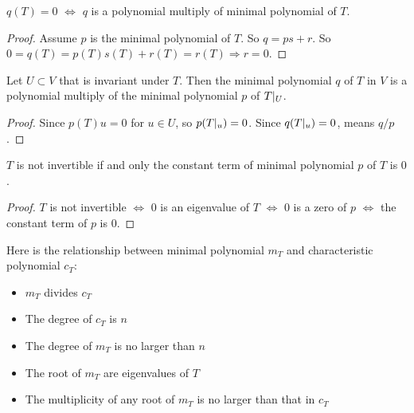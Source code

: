 \begin{theorem}\label{polynomial_multiply_of_minimal_polynomial}
    $q(T) = 0$ $\Leftrightarrow$ $q$ is a polynomial multiply of minimal polynomial of $T$.
\end{theorem}
\begin{proof}
    Assume $p$ is the minimal polynomial of $T$. So $q = ps + r$. So $0 = q(T) = p(T) s(T) + r(T) = r(T) \Rightarrow r = 0$.
\end{proof}


\begin{theorem}
    Let $U \subset V$ that is invariant under $T$. Then the minimal polynomial $q$ of $T$ in $V$ is a polynomial multiply of the minimal polynomial $p$ of ${T}|_{U}$.
\end{theorem}
\begin{proof}
    Since $p(T)u=0$ for $u \in U$, so $p({T}|_{u}) = 0$. Since $q({T}|_{u}) = 0$,  means $q/p$.
\end{proof}

\begin{theorem}
    $T$ is not invertible if and only the constant term of minimal polynomial $p$ of $T$ is $0$.
\end{theorem}
\begin{proof}
    $T$ is not invertible $\Leftrightarrow$ $0$ is an eigenvalue of $T$ $\Leftrightarrow$ $0$ is a zero of $p$ $\Leftrightarrow$ the constant term of $p$ is $0$.
\end{proof}


\begin{theorem}
    Here is the relationship between minimal polynomial $m_T$ and characteristic polynomial $c_T$:
    \begin{itemize}
        \item $m_T$ divides $c_T$
        \item The degree of $c_T$ is $n$
        \item The degree of $m_T$ is no larger than $n$
        \item The root of $m_T$ are eigenvalues of $T$
        \item The multiplicity of any root of $m_T$ is no larger than that in $c_T$
    \end{itemize}
\end{theorem}
































